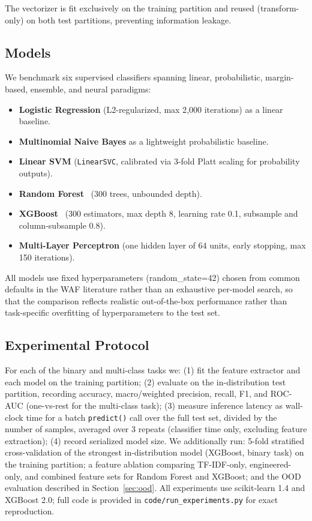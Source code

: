 \documentclass{ieeeaccess}
\begin{document}
The vectorizer is fit exclusively on the training partition and reused
(transform-only) on both test partitions, preventing information leakage.

\subsection{Models}

We benchmark six supervised classifiers spanning linear, probabilistic,
margin-based, ensemble, and neural paradigms:

\begin{itemize}
\item \textbf{Logistic Regression} (L2-regularized, max 2{,}000 iterations) as
  a linear baseline.
\item \textbf{Multinomial Naive Bayes} as a lightweight probabilistic
  baseline.
\item \textbf{Linear SVM} (\texttt{LinearSVC}, calibrated via 3-fold Platt
  scaling for probability outputs).
\item \textbf{Random Forest}~\cite{breiman2001} (300 trees, unbounded depth).
\item \textbf{XGBoost}~\cite{xgboost2016} (300 estimators, max depth 8,
  learning rate 0.1, subsample and column-subsample 0.8).
\item \textbf{Multi-Layer Perceptron} (one hidden layer of 64 units, early
  stopping, max 150 iterations).
\end{itemize}

All models use fixed hyperparameters (random\_state=42) chosen from common
defaults in the WAF literature rather than an exhaustive per-model search, so
that the comparison reflects realistic out-of-the-box performance rather than
task-specific overfitting of hyperparameters to the test set.

\subsection{Experimental Protocol}

For each of the binary and multi-class tasks we: (1) fit the feature extractor
and each model on the training partition; (2) evaluate on the in-distribution
test partition, recording accuracy, macro/weighted precision, recall, F1, and
ROC-AUC (one-vs-rest for the multi-class task); (3) measure inference latency
as wall-clock time for a batch \texttt{predict()} call over the full test set,
divided by the number of samples, averaged over 3 repeats (classifier time
only, excluding feature extraction); (4) record serialized model size. We
additionally run: 5-fold stratified cross-validation of the strongest
in-distribution model (XGBoost, binary task) on the training partition; a
feature ablation comparing TF-IDF-only, engineered-only, and combined feature
sets for Random Forest and XGBoost; and the OOD evaluation described in
Section~\ref{sec:ood}. All experiments use scikit-learn 1.4 and XGBoost 2.0;
full code is provided in \texttt{code/run\_experiments.py} for exact
reproduction.
\end{document}

